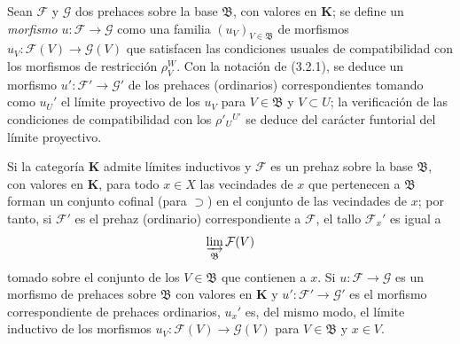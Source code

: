 \begin{env}[3.2.3]
\label{0.3.2.3-fr}
Sean $\mathcal{F}$ y $\mathcal{G}$ dos prehaces sobre la base
$\mathfrak{B}$, con valores en $\boldsymbol{K}$; se define un \emph{morfismo}
$u:\mathcal{F}\to\mathcal{G}$ como una familia
$(u_V)_{V\in\mathfrak{B}}$ de morfismos
$u_V:\mathcal{F}(V)\to\mathcal{G}(V)$ que satisfacen las condiciones
usuales de compatibilidad con los morfismos de restricción $\rho_V^W$. Con
la notación de (3.2.1), se deduce un morfismo
$u':\mathcal{F}'\to\mathcal{G}'$ de los prehaces (ordinarios) correspondientes
tomando como $u_U'$ el límite proyectivo de los $u_V$ para
$V\in\mathfrak{B}$ y $V\subset U$; la verificación de las condiciones de
compatibilidad con los $\rho'_U{}^{U'}$ se deduce del carácter funtorial del
límite proyectivo.
\end{env}

\begin{env}[3.2.4]
\label{0.3.2.4-fr}
Si la categoría $\boldsymbol{K}$ admite límites inductivos y $\mathcal{F}$
es un prehaz sobre la base $\mathfrak{B}$, con valores en $\boldsymbol{K}$,
para todo $x\in X$ las vecindades de $x$ que pertenecen a $\mathfrak{B}$ forman
un conjunto cofinal (para $\supset$) en el conjunto de las vecindades de $x$;
por tanto, si $\mathcal{F}'$ es el prehaz (ordinario) correspondiente a
$\mathcal{F}$, el tallo $\mathcal{F}_x'$ es igual a
\[
  \varinjlim_{\mathfrak{B}}\mathcal{F}(V)
\]
tomado sobre el conjunto de los $V\in\mathfrak{B}$ que contienen a $x$.
Si $u:\mathcal{F}\to\mathcal{G}$ es un morfismo de prehaces sobre
$\mathfrak{B}$ con valores en $\boldsymbol{K}$ y
$u':\mathcal{F}'\to\mathcal{G}'$ es el morfismo correspondiente de prehaces
ordinarios, $u_x'$ es, del mismo modo, el límite inductivo de los morfismos
$u_V:\mathcal{F}(V)\to\mathcal{G}(V)$ para $V\in\mathfrak{B}$ y $x\in V$.
\end{env}

